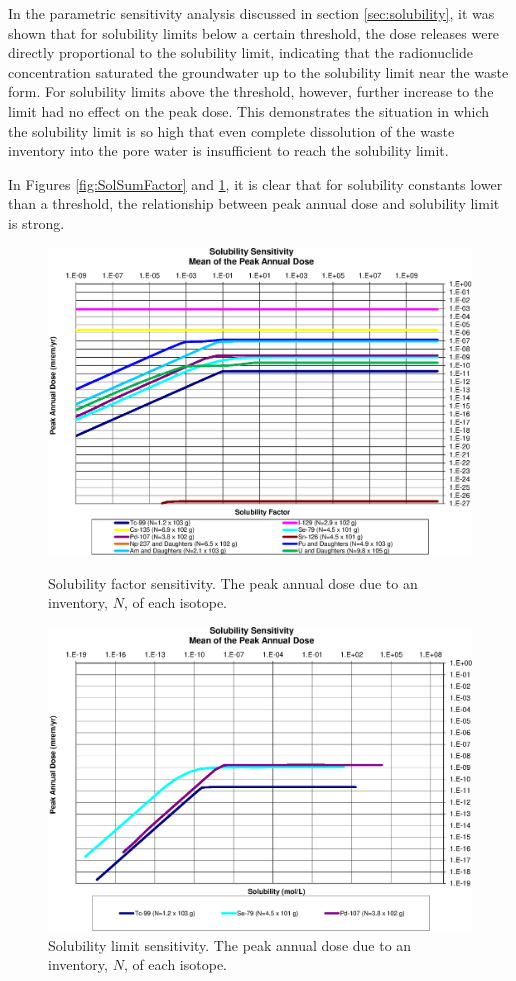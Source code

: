 In the parametric sensitivity analysis discussed in section
\ref{sec:solubility}, it was shown that for solubility limits below a certain threshold, the dose releases were directly 
proportional to the solubility limit, indicating that the radionuclide 
concentration saturated the groundwater up to the solubility limit near the 
waste form.  For solubility limits above the threshold, however, further 
increase to the limit had no effect on the peak dose. This demonstrates the 
situation in which the solubility limit is so high that even complete 
dissolution of the waste inventory into the pore water is insufficient to reach 
the solubility limit.

In Figures \ref{fig:SolSumFactor} and \ref{fig:SolSum}, it is clear that for 
solubility constants lower than a threshold, the relationship between peak 
annual dose and solubility limit is strong.

\begin{figure}[ht]
\centering
\includegraphics[width=0.7\linewidth]{./chapters/nuclide_sensitivity/clay/Solubility/Solubility_Summary_SolFactor.eps}
\caption{Solubility factor sensitivity. The peak annual dose due to an inventory, 
$N$, of each isotope.}
\label{fig:SolSumFactor}

\includegraphics[width=0.7\linewidth]{./chapters/nuclide_sensitivity/clay/Solubility/Solubility_Summary_Sol.eps}
\caption{Solubility limit sensitivity. The peak annual dose due to an inventory, 
$N$, of each isotope.}
\label{fig:SolSum}
\end{figure}
\clearpage
